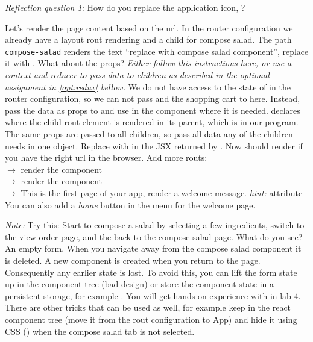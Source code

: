 \documentclass[fleqn, article, a4paper]{memoir}
\begin{document}
\begin{Assignments}
\noindent \emph{Reflection question 1:} How do you replace the application icon, ?


\item Let's render the page content based on the url. In the router configuration we already have a layout rout rendering  and a child for compose salad. The path \texttt{compose-salad} renders the text ``replace with compose salad component'', replace it with . What about the props? \emph{Either follow this instructions here, or use a context and reducer to pass data to children as described in the optional assignment in \ref{opt:redux} bellow.} We do not have access to the state of  in the router configuration, so we can not pass  and the shopping cart to  here. Instead, pass the data as props to  and use  in the component where it is needed.  declares where the child rout element is rendered in its parent, which is  in our program. The same props are passed to all children, so pass all data any of the children needs in one object. Replace  with  in the JSX returned by . Now  should render if you have the right url in the browser. Add more routs:
\\  $\rightarrow$ render the  component
\\  $\rightarrow$ render the  component
\\  $\rightarrow$ This is the first page of your app, render a welcome message. \emph{hint:}  attribute
\\You can also add a \emph{home} button in the menu for the welcome page.

\emph{Note:} Try this: Start to compose a salad by selecting a few ingredients, switch to the view order page, and the back to the compose salad page. What do you see? An empty form. When you navigate away from the compose salad component it is deleted. A new component is created when you return to the page. Consequently any earlier state is lost. To avoid this, you can lift the form state up in the component tree (bad design) or store the component state in a persistent storage, for example . You will get hands on experience with  in lab 4. There are other tricks that can be used as well, for example keep  in the react component tree (move it from the rout configuration to App) and hide it using CSS () when the compose salad tab is not selected.


\end{Assignments}
\end{document}
